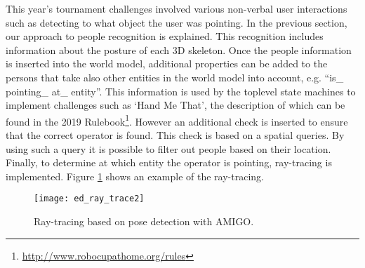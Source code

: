 This year’s tournament challenges involved various non-verbal user interactions such as detecting to what object the user was pointing. In the previous section, our approach to people recognition is explained. This recognition includes information about the posture of each 3D skeleton. Once the people information is inserted into the world model, additional properties can be added to the persons that take also other entities in the world model into account, e.g. “is\_ pointing\_ at\_ entity”. This information is used by the toplevel state machines to implement challenges such as `Hand Me That', the description of which can be found in the 2019 Rulebook\footnote{\url{http://www.robocupathome.org/rules}}. However an additional check is inserted to ensure that the correct operator is  found. This check is based on a spatial queries. By using such a query it is possible to filter out people based on their location. Finally, to determine at which entity the operator is pointing, ray-tracing is implemented. Figure \ref{fig:ray_trace} shows an example of the ray-tracing.

\begin{figure}[H]
	\centering
    \texttt{[image: ed\_ray\_trace2]}
	\caption{Ray-tracing based on pose detection with AMIGO.}
	\label{fig:ray_trace}
\end{figure}


